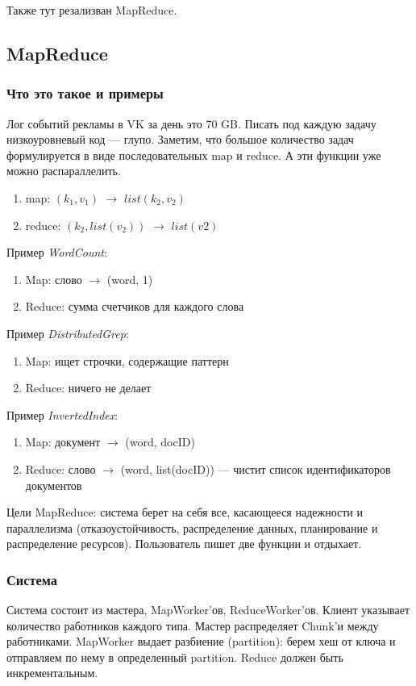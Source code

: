 \documentclass[12pt]{article}
\begin{document}
    \quad Также тут резализван MapReduce.

\subsection{MapReduce}
\subsubsection{Что это такое и примеры}
    \quad Лог событий рекламы в VK за день это 70 GB. Писать под каждую задачу низкоуровневый код --- глупо. Заметим, что большое количество задач формулируется в виде последовательных map и reduce. А эти функции уже можно распараллелить.
    \begin{enumerate}
        \item map: $(k_1, v_1)$ $\rightarrow$ $list(k_2, v_2)$
        \item reduce: $(k_2, list(v_2))$ $\rightarrow$ $list(v2)$
    \end{enumerate}
    
    Пример \textit{WordCount}:
    \begin{enumerate}
        \item Map: слово $\rightarrow$ (word, 1)
        \item Reduce: сумма счетчиков для каждого слова
    \end{enumerate}
    
    Пример \textit{DistributedGrep}:
    \begin{enumerate}
        \item Map: ищет строчки, содержащие паттерн
        \item Reduce: ничего не делает
    \end{enumerate}
    \newpage
    Пример \textit{InvertedIndex}:
    \begin{enumerate}
        \item Map: документ $\rightarrow$ (word, docID)
        \item Reduce: слово $\rightarrow$ (word, list(docID)) --- чистит список идентификаторов документов
    \end{enumerate}
    
    \quad Цели MapReduce: система берет на себя все, касающееся надежности и параллелизма (отказоустойчивость, распределение данных, планирование и распределение ресурсов). Пользователь пишет две функции и отдыхает.
    
\subsubsection{Система}
    \quad Система состоит из мастера, MapWorker'ов, ReduceWorker'ов. Клиент указывает количество работников каждого типа. Мастер распределяет Chunk'и между работниками. MapWorker выдает разбиение (partition): берем хеш от ключа и отправляем по нему в определенный partition. Reduce должен быть инкрементальным.
    
\end{document}

